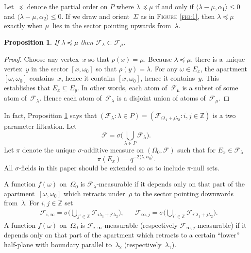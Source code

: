 \documentclass[a4paper]{amsart}
\newcommand{\sprod}[2]{{\langle #1, #2\rangle}}
\newcommand{\seq}[2]{\left({#1}: {#2}\right)}
\newcommand{\ZZ}{\mathbb{Z}}
\theoremstyle{plain}
\newtheorem{proposition}{Proposition}[section]
\theoremstyle{definition}
\theoremstyle{remark}
\numberwithin{equation}{section}
\theoremstyle{plain}
\begin{document}
Let $\preceq$ denote the partial order on $P$ where $\lambda \preceq
\mu$ if and only if $\sprod{\lambda - \mu}{\alpha_1} \leq 0$ and
$\sprod{\lambda - \mu}{\alpha_2} \leq 0$.  If we draw and
orient~$\Sigma$ as in \textsc{Figure \ref{fig:1}}, then $\lambda
\preceq \mu$ exactly when $\mu$~lies in the sector pointing
upwards from~$\lambda$.

\begin{proposition}
\label{prop:0}
If $\lambda \preceq \mu$ then $\mathcal{F}_\lambda \subset
\mathcal{F}_\mu$.
\end{proposition}
\begin{proof}
Choose any vertex~$x$ so that $\rho(x)=\mu$. Because $\lambda \preceq
\mu$, there is a unique vertex~$y$ in the sector $[x,\omega_0]$ so
that $\rho(y)=\lambda$.  For any $\omega\in E_x$, the apartment
$[\omega,\omega_0]$ contains~$x$, hence it contains $[x,\omega_0]$,
hence it contains~$y$.  This establishes that $E_x\subseteq E_y$.  In
other words, each atom of~$\mathcal{F}_\mu$ is a subset of some atom
of~$\mathcal{F}_\lambda$.  Hence each atom of~$\mathcal{F}_\lambda$ is
a disjoint union of atoms of~$\mathcal{F}_\mu$.
\end{proof}
In fact, Proposition \ref{prop:0} says that $\seq{\mathcal{F}_\lambda}{\lambda\in P}
=\seq{\mathcal{F}_{i\lambda_1+j\lambda_2}}{i,j\in\ZZ}$ is a two
parameter filtration.  Let
\begin{equation*}
  \mathcal{F} = \sigma \Big(\bigcup_{\lambda \in P} \mathcal{F}_\lambda \Big).
\end{equation*}
Let $\pi$ denote the unique $\sigma$-additive measure on $(\Omega_0,
\mathcal{F})$ such that for $E_x \in \mathcal{F}_\lambda$
\begin{equation*}
	\pi(E_x) = q^{-2\sprod{\lambda}{\alpha_0}}.
\end{equation*}
All $\sigma$-fields in this paper should be extended so as to include
$\pi$-null sets.

A function $f(\omega)$ on~$\Omega_0$ is
$\mathcal{F}_\lambda$-measurable if it depends only on that part of
the apartment~$[\omega,\omega_0]$ which retracts under~$\rho$ to the
sector pointing downwards from~$\lambda$.  For $i, j \in \ZZ$ set
\begin{align*}
&\mathcal{F}_{i, \infty} = \sigma\Big(\bigcup_{j' \in \ZZ}
\mathcal{F}_{i \lambda_1 + j' \lambda_2}\Big), &
&\mathcal{F}_{\infty, j} = \sigma\Big(\bigcup_{i' \in \ZZ}
\mathcal{F}_{i'\lambda_1 + j \lambda_2}\Big).
\end{align*}
A function $f(\omega)$ on~$\Omega_0$ is
$\mathcal{F}_{i,\infty}$-measurable (respectively
$\mathcal{F}_{\infty,j}$-measurable) if it depends only on that part
of the apartment which retracts to a certain ``lower'' half-plane with
boundary parallel to~$\lambda_2$ (respectively~$\lambda_1$).
\end{document}
